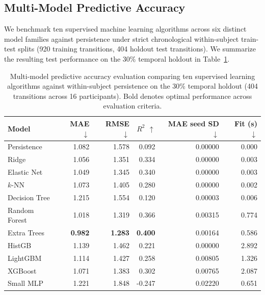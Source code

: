\documentclass[runningheads]{llncs}
\begin{document}
\subsection{Multi-Model Predictive Accuracy}
We benchmark ten supervised machine learning algorithms across six distinct model families against persistence under strict chronological within-subject train-test splits (920 training transitions, 404 holdout test transitions). We summarize the resulting test performance on the 30\% temporal holdout in Table~\ref{tab:models_results}.

\begin{table}[H]
\centering
\caption{Multi-model predictive accuracy evaluation comparing ten supervised learning algorithms against within-subject persistence on the 30\% temporal holdout (404 transitions across 16 participants). Bold denotes optimal performance across evaluation criteria.}
\label{tab:models_results}
\begingroup\small\setlength{\tabcolsep}{3.5pt}
\begin{tabular*}{\linewidth}{@{\extracolsep{\fill}}lrrrrr}
\toprule
Model & MAE $\downarrow$ & RMSE $\downarrow$ & $R^2$ $\uparrow$ & \shortstack{MAE seed\\SD $\downarrow$} & \shortstack{Fit (s)\\$\downarrow$}\\
\midrule
Persistence & 1.082 & 1.578 & 0.092 & 0.00000 & 0.000\\
Ridge & 1.056 & 1.351 & 0.334 & 0.00000 & 0.003\\
Elastic Net & 1.049 & 1.345 & 0.340 & 0.00000 & 0.003\\
$k$-NN & 1.073 & 1.405 & 0.280 & 0.00000 & 0.002\\
Decision Tree & 1.215 & 1.554 & 0.120 & 0.00003 & 0.006\\
Random Forest & 1.018 & 1.319 & 0.366 & 0.00315 & 0.774\\
Extra Trees & \textbf{0.982} & \textbf{1.283} & \textbf{0.400} & 0.00164 & 0.586\\
HistGB & 1.139 & 1.462 & 0.221 & 0.00000 & 2.892\\
LightGBM & 1.114 & 1.427 & 0.258 & 0.00805 & 1.326\\
XGBoost & 1.071 & 1.383 & 0.302 & 0.00765 & 2.087\\
Small MLP & 1.221 & 1.848 & -0.247 & 0.02220 & 0.651\\
\bottomrule
\end{tabular*}\endgroup
\end{table}
\end{document}

